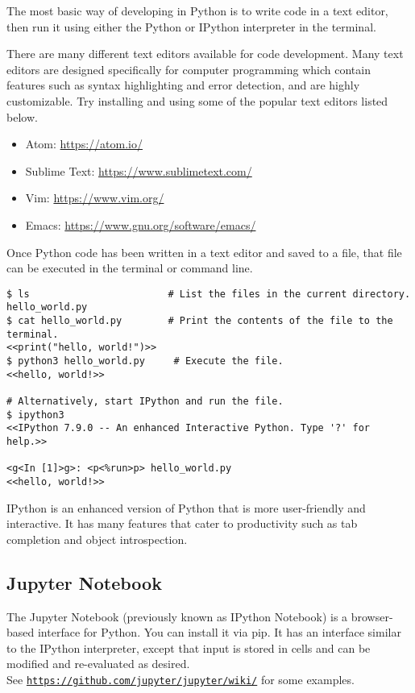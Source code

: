 The most basic way of developing in Python is to write code in a text editor, then run it using either the Python or IPython interpreter in the terminal.

There are many different text editors available for code development. Many text editors are designed specifically for computer programming which contain features such as syntax highlighting and error detection, and are highly customizable.
Try installing and using some of the popular text editors listed below.
\begin{itemize}
\item Atom: \url{https://atom.io/}
\item Sublime Text: \url{https://www.sublimetext.com/}
\item Vim: \url{https://www.vim.org/}
\item Emacs: \url{https://www.gnu.org/software/emacs/}
\end{itemize}

Once Python code has been written in a text editor and saved to a file, that file can be executed in the terminal or command line.
\begin{lstlisting}
$ ls                        # List the files in the current directory.
hello_world.py
$ cat hello_world.py        # Print the contents of the file to the terminal.
<<print("hello, world!")>>
$ python3 hello_world.py     # Execute the file.
<<hello, world!>>

# Alternatively, start IPython and run the file.
$ ipython3
<<IPython 7.9.0 -- An enhanced Interactive Python. Type '?' for help.>>

<g<In [1]>g>: <p<%run>p> hello_world.py
<<hello, world!>>
\end{lstlisting}

IPython is an enhanced version of Python that is more user-friendly and interactive.
It has many features that cater to productivity such as tab completion and object introspection.

\subsection*{Jupyter Notebook} %

The Jupyter Notebook (previously known as IPython Notebook) is a
browser-based interface for Python. You can install it via pip.
It has an interface similar to the IPython interpreter, except that
input is stored in cells and can be modified and re-evaluated as
desired.\\
See \href{https://github.com/jupyter/jupyter/wiki/A-gallery-of-interesting-Jupyter-Notebooks}{\texttt{https://github.com/jupyter/jupyter/wiki/}}
for some
examples. 

